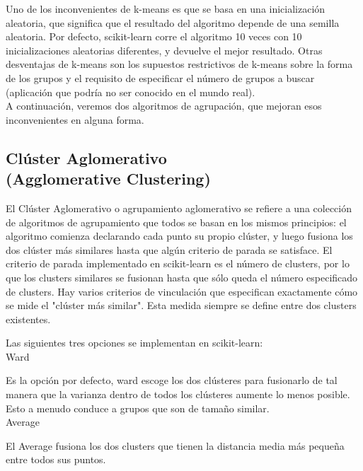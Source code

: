Uno de los inconvenientes de k-means es que se basa en una inicialización aleatoria, que
significa que el resultado del algoritmo depende de una semilla aleatoria. Por defecto, {\ttfamily scikit-learn}  corre   el algoritmo 10 veces con 10 inicializaciones aleatorias diferentes, y
devuelve el mejor resultado.   
Otras desventajas de k-means son los supuestos   restrictivos de  k-means  sobre la forma de los grupos y el requisito de especificar el número  de grupos a buscar (aplicación que podría no ser conocido
en el mundo real).\\


A continuación, veremos dos algoritmos de agrupación, que mejoran esos inconvenientes en alguna forma.


\subsection{Clúster  Aglomerativo \\ (Agglomerative Clustering)}

El  Clúster  Aglomerativo o  agrupamiento aglomerativo se refiere a una colección de algoritmos de agrupamiento que todos se basan en los mismos principios: el algoritmo comienza declarando cada punto su propio clúster, y luego fusiona los dos clúster más similares hasta que algún criterio de parada se satisface.  El criterio de parada implementado en scikit-learn es el número de clusters, por lo que los clusters similares se fusionan hasta que sólo queda el número especificado de clusters. Hay varios criterios de vinculación que especifican exactamente cómo se mide el "{}clúster más similar"{}. Esta medida siempre se define entre dos clusters existentes. 

Las siguientes tres opciones se implementan en scikit-learn:\\



{\ttfamily Ward}

Es la opción por defecto, ward escoge los dos clústeres para fusionarlo de tal manera que la varianza dentro de todos los clústeres aumente lo menos posible. Esto a menudo conduce a grupos que son de tamaño similar.\\


{\ttfamily  Average}

El  Average  fusiona los dos clusters que tienen la distancia media más pequeña entre todos sus puntos.\\




